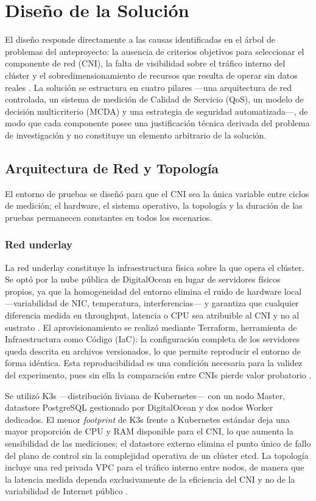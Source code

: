 \section{Diseño de la Solución}

El diseño responde directamente a las causas identificadas en el árbol de problemas del anteproyecto: la ausencia de criterios objetivos para seleccionar el componente de red (CNI), la falta de visibilidad sobre el tráfico interno del clúster y el sobredimensionamiento de recursos que resulta de operar sin datos reales \cite{ref29}. La solución se estructura en cuatro pilares ---una arquitectura de red controlada, un sistema de medición de Calidad de Servicio (QoS), un modelo de decisión multicriterio (MCDA) y una estrategia de seguridad automatizada---, de modo que cada componente posee una justificación técnica derivada del problema de investigación y no constituye un elemento arbitrario de la solución.

\subsection{Arquitectura de Red y Topología}

El entorno de pruebas se diseñó para que el CNI sea la única variable entre ciclos de medición; el hardware, el sistema operativo, la topología y la duración de las pruebas permanecen constantes en todos los escenarios.

\subsubsection{Red underlay}

La red underlay constituye la infraestructura física sobre la que opera el clúster. Se optó por la nube pública de DigitalOcean en lugar de servidores físicos propios, ya que la homogeneidad del entorno elimina el ruido de hardware local ---variabilidad de NIC, temperatura, interferencias--- y garantiza que cualquier diferencia medida en throughput, latencia o CPU sea atribuible al CNI y no al sustrato \cite{ref2}. El aprovisionamiento se realizó mediante Terraform, herramienta de Infraestructura como Código (IaC): la configuración completa de los servidores queda descrita en archivos versionados, lo que permite reproducir el entorno de forma idéntica. Esta reproducibilidad es una condición necesaria para la validez del experimento, pues sin ella la comparación entre CNIs pierde valor probatorio \cite{ref7}.

Se utilizó K3s ---distribución liviana de Kubernetes--- con un nodo Master, datastore PostgreSQL gestionado por DigitalOcean y dos nodos Worker dedicados. El menor \emph{footprint} de K3s frente a Kubernetes estándar deja una mayor proporción de CPU y RAM disponible para el CNI, lo que aumenta la sensibilidad de las mediciones; el datastore externo elimina el punto único de fallo del plano de control sin la complejidad operativa de un clúster etcd. La topología incluye una red privada VPC para el tráfico interno entre nodos, de manera que la latencia medida dependa exclusivamente de la eficiencia del CNI y no de la variabilidad de Internet público \cite{ref8}.

